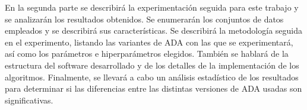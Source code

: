 En la segunda parte se describirá la experimentación seguida para este trabajo y se analizarán los resultados obtenidos. Se enumerarán los conjuntos de datos empleados y se describirá sus características. Se describirá la metodología seguida en el experimento, listando las variantes de ADA con las que se experimentará, así como los parámetros e hiperparámetros elegidos. También se hablará de la estructura del software desarrollado y de los detalles de la implementación de los algoritmos. Finalmente, se llevará a cabo un análisis estadístico de los resultados para determinar si las diferencias entre las distintas versiones de ADA usadas son significativas.




